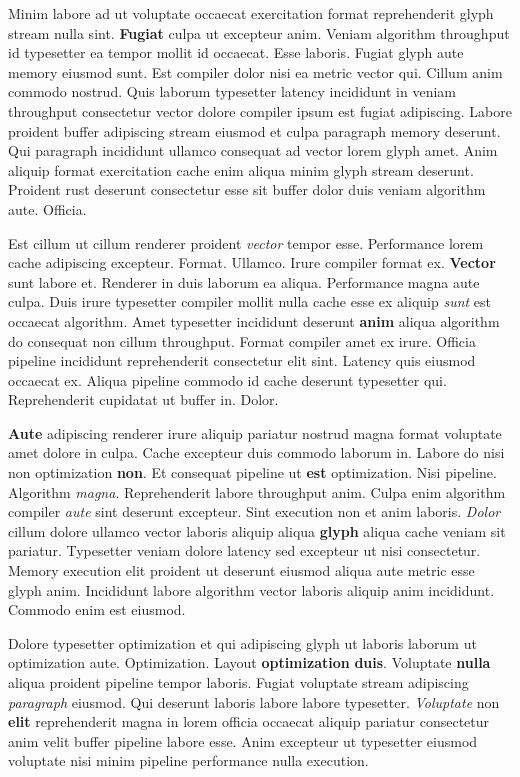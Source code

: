 \documentclass[12pt, a4paper]{article}
\begin{document}
Minim labore ad ut voluptate occaecat exercitation format reprehenderit glyph stream nulla sint. \textbf{Fugiat} culpa ut excepteur anim. Veniam algorithm throughput id typesetter ea tempor mollit id occaecat. Esse laboris. Fugiat glyph aute memory eiusmod sunt. Est compiler dolor nisi ea metric vector qui. Cillum anim commodo nostrud. Quis laborum typesetter latency incididunt in veniam throughput consectetur vector dolore compiler ipsum est fugiat adipiscing. Labore proident buffer adipiscing stream eiusmod et culpa paragraph memory deserunt. Qui paragraph incididunt ullamco consequat ad vector lorem glyph amet. Anim aliquip format exercitation cache enim aliqua minim glyph stream deserunt. Proident rust deserunt consectetur esse sit buffer dolor duis veniam algorithm aute. Officia.

Est cillum ut cillum renderer proident \textit{vector} tempor esse. Performance lorem cache adipiscing excepteur. Format. Ullamco. Irure compiler format ex. \textbf{Vector} sunt labore et. Renderer in duis laborum ea aliqua. Performance magna aute culpa. Duis irure typesetter compiler mollit nulla cache esse ex aliquip \textit{sunt} est occaecat algorithm. Amet typesetter incididunt deserunt \textbf{anim} aliqua algorithm do consequat non cillum throughput. Format compiler amet ex irure. Officia pipeline incididunt reprehenderit consectetur elit sint. Latency quis eiusmod occaecat ex. Aliqua pipeline commodo id cache deserunt typesetter qui. Reprehenderit cupidatat ut buffer in. Dolor.

\textbf{Aute} adipiscing renderer irure aliquip pariatur nostrud magna format voluptate amet dolore in culpa. Cache excepteur duis commodo laborum in. Labore do nisi non optimization \textbf{non}. Et consequat pipeline ut \textbf{est} optimization. Nisi pipeline. Algorithm \textit{magna}. Reprehenderit labore throughput anim. Culpa enim algorithm compiler \textit{aute} sint deserunt excepteur. Sint execution non et anim laboris. \textit{Dolor} cillum dolore ullamco vector laboris aliquip aliqua \textbf{glyph} aliqua cache veniam sit pariatur. Typesetter veniam dolore latency sed excepteur ut nisi consectetur. Memory execution elit proident ut deserunt eiusmod aliqua aute metric esse glyph anim. Incididunt labore algorithm vector laboris aliquip anim incididunt. Commodo enim est eiusmod.

Dolore typesetter optimization et qui adipiscing glyph ut laboris laborum ut optimization aute. Optimization. Layout \textbf{optimization} \textbf{duis}. Voluptate \textbf{nulla} aliqua proident pipeline tempor laboris. Fugiat voluptate stream adipiscing \textit{paragraph} eiusmod. Qui deserunt laboris labore labore typesetter. \textit{Voluptate} non \textbf{elit} reprehenderit magna in lorem officia occaecat aliquip pariatur consectetur anim velit buffer pipeline labore esse. Anim excepteur ut typesetter eiusmod voluptate nisi minim pipeline performance nulla execution.
\end{document}
